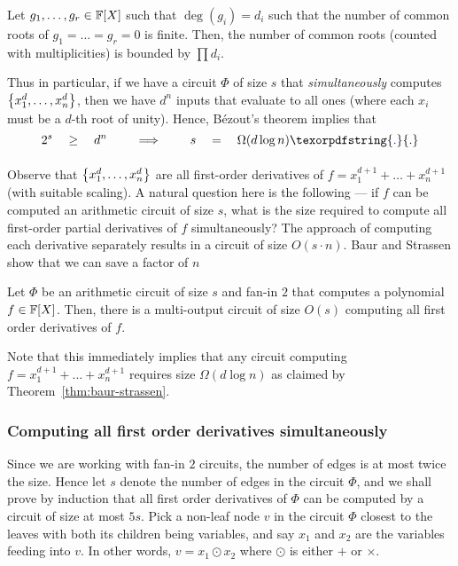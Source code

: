 \documentclass{birkjour}
\newcommand{\spaced}[1]{\quad#1\quad}
\newcommand{\Bezout}{B\'{e}zout}
\providecommand{\DIFaddtex}[1]{{\protect\color{blue}\uwave{#1}}} %
\providecommand{\DIFaddbegin}{} %
\providecommand{\DIFaddend}{} %
\providecommand{\DIFadd}[1]{\texorpdfstring{\DIFaddtex{#1}}{#1}} %
\begin{document}
\begin{theorem}[\Bezout's theorem]
  Let $g_1,\dots, g_r \in \mathbb{F}[X]$ such that $\deg(g_i) = d_i$ such that the number of common roots of $g_1=\dots=g_r = 0$ is finite. Then, the number of common roots (counted with multiplicities) is bounded by $\prod d_i$.
\end{theorem}

Thus in particular, if we have a circuit $\Phi$ of size $s$ that \emph{simultaneously} computes $\left\{x_1^d, \dots,x_n^d\right\}$, then we have $d^n$ inputs that evaluate to all ones (where each $x_i$ must be  a $d$-th root of unity). Hence, \Bezout's theorem implies that
$$
2^s\spaced{\geq} d^n \spaced{\quad\implies\quad} s \spaced{=} \Omega(d\log n)\DIFaddbegin \DIFadd{.
}\DIFaddend $$

Observe that $\left\{x_1^d,\dots, x_n^d\right\}$ are all first-order derivatives of $f = x_1^{d+1}+\dots+x_n^{d+1}$ (with suitable scaling). A natural question here is the following --- if $f$ can be computed an arithmetic circuit of size $s$, what is the size required to compute all first-order partial derivatives of $f$ simultaneously? The \naive approach of computing each derivative separately results in a circuit of size $O(s\cdot n)$. Baur and Strassen \cite{BS83} show that we can save a factor of $n$\DIFaddbegin \DIFadd{.
}\DIFaddend 

\begin{lemma}[\cite{BS83}]\label{lem:baur-strassen}
  Let $\Phi$ be an arithmetic circuit of size $s$ and fan-in $2$ that computes a polynomial $f\in \mathbb{F}[X]$. Then, there is a multi-output circuit  of size $O(s)$ computing all first order derivatives of $f$.
\end{lemma}

Note that this immediately implies that any circuit computing $f = x_1^{d+1} + \dots + x_n^{d+1}$ requires size $\Omega(d\log n)$ as claimed by Theorem~\ref{thm:baur-strassen}. 


\subsubsection{Computing all first order derivatives simultaneously}

Since we are working with fan-in $2$ circuits, the number of edges is at most twice the size. Hence let $s$ denote the number of edges in the circuit $\Phi$, and we shall prove by induction that all first order derivatives of $\Phi$ can be computed by a circuit of size at most $5s$. Pick a non-leaf node $v$ in the circuit $\Phi$ closest to the leaves with both its children being variables, and say $x_1$ and $x_2$ are the variables feeding into $v$. In other words, $v = x_1 \odot x_2$ where $\odot$ is either $+$ or $\times$.
\end{document}
